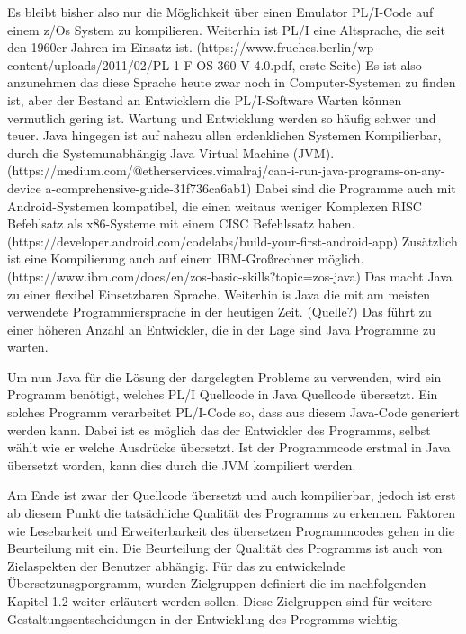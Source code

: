 Es bleibt bisher also nur die Möglichkeit über einen Emulator PL/I-Code auf einem z/Os System zu kompilieren. Weiterhin ist PL/I eine Altsprache, die seit den 1960er Jahren im Einsatz ist.  (https://www.fruehes.berlin/wp-content/uploads/2011/02/PL-1-F-OS-360-V-4.0.pdf, erste Seite) Es ist also anzunehmen das diese Sprache heute zwar noch in Computer-Systemen zu finden ist, aber der Bestand an Entwicklern die PL/I-Software Warten können vermutlich gering ist. Wartung und Entwicklung werden so häufig schwer und teuer.
Java hingegen ist auf nahezu allen erdenklichen Systemen Kompilierbar, durch die Systemunabhängig Java Virtual Machine (JVM). 
(https://medium.com/@etherservices.vimalraj/can-i-run-java-programs-on-any-device
a-comprehensive-guide-31f736ca6ab1) 
Dabei sind die Programme auch mit Android-Systemen kompatibel, die einen weitaus weniger Komplexen RISC Befehlsatz als x86-Systeme mit einem CISC Befehlssatz haben.
(https://developer.android.com/codelabs/build-your-first-android-app) 
Zusätzlich ist eine Kompilierung auch auf einem IBM-Großrechner möglich. (https://www.ibm.com/docs/en/zos-basic-skills?topic=zos-java)
Das macht Java zu einer flexibel Einsetzbaren Sprache. Weiterhin is Java die mit am meisten verwendete Programmiersprache in der heutigen Zeit. (Quelle?) Das führt zu einer höheren Anzahl an Entwickler, die in der Lage sind Java Programme zu warten.

Um nun Java für die Lösung der dargelegten Probleme zu verwenden, wird ein Programm benötigt, welches PL/I Quellcode in Java Quellcode übersetzt. Ein solches Programm verarbeitet PL/I-Code so, dass aus diesem Java-Code generiert werden kann. Dabei ist es möglich das der Entwickler des Programms, selbst wählt wie er welche Ausdrücke übersetzt. Ist der Programmcode erstmal in Java übersetzt worden, kann dies durch die JVM kompiliert werden.

Am Ende ist zwar der Quellcode übersetzt und auch kompilierbar, jedoch ist erst ab diesem Punkt die tatsächliche Qualität des Programms zu erkennen. Faktoren wie Lesebarkeit und Erweiterbarkeit des übersetzen Programmcodes gehen in die Beurteilung mit ein. 
Die Beurteilung der Qualität des Programms ist auch von Zielaspekten der Benutzer abhängig. Für das zu entwickelnde Übersetzunsgporgramm, wurden Zielgruppen definiert die im nachfolgenden Kapitel 1.2 weiter erläutert werden sollen. Diese Zielgruppen sind für weitere Gestaltungsentscheidungen in der Entwicklung des Programms wichtig.

\pagebreak
     
